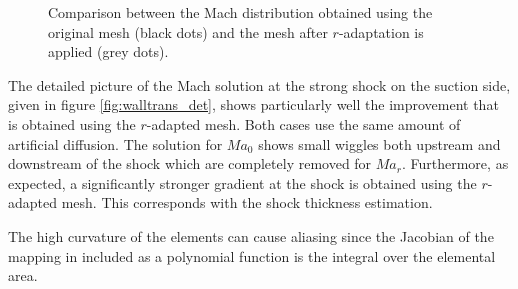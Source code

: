 \documentclass[review]{elsarticle}
\begin{document}
\begin{figure}[!htbp]
\begin{center}
\caption{Comparison between the Mach distribution obtained using the original mesh (black dots) and the mesh after $r$-adaptation is applied (grey dots).}
\label{fig:machtranswall}
\end{center}
\end{figure}
The detailed picture of the Mach solution at the strong shock on the suction side, given in figure \ref{fig:walltrans_det}, shows particularly well the improvement that is obtained using the $r$-adapted mesh.
Both cases use the same amount of artificial diffusion.
The solution for $Ma_0$ shows small wiggles both upstream and downstream of the shock which are completely removed for $Ma_r$.
Furthermore, as expected, a significantly stronger gradient at the shock is obtained using the $r$-adapted mesh.
This corresponds with the shock thickness estimation. 
\par The high curvature of the elements can cause aliasing since the Jacobian of the mapping in included as a polynomial function is the integral over the elemental area.
\end{document}
